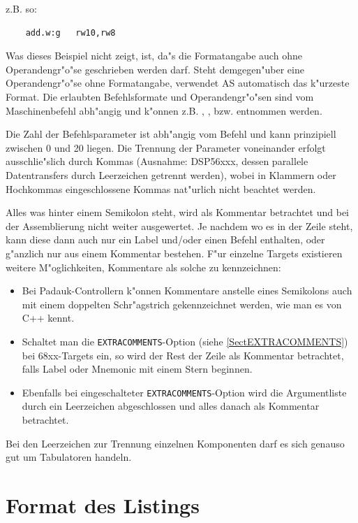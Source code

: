 \documentclass[12pt,a4paper,twoside]{report}
\newcommand{\tty}[1]{{\tt #1}}
\newcommand{\asname}{AS}
\begin{document}
z.B. so:
\begin{verbatim}
    add.w:g   rw10,rw8
\end{verbatim}
Was dieses Beispiel nicht zeigt, ist, da"s die Formatangabe auch ohne
Operandengr"o"se geschrieben werden darf.  Steht demgegen"uber eine
Operandengr"o"se ohne Formatangabe, verwendet \asname{} automatisch das
k"urzeste Format.  Die erlaubten Befehlsformate und Operandengr"o"sen
sind vom Maschinenbefehl abh"angig und k"onnen z.B. \cite{Tosh9000},
\cite{HitH8_5}, \cite{MitM16} bzw. \cite{MitM16C} entnommen werden.
\par
Die Zahl der Befehlsparameter ist abh"angig vom Befehl und kann
prinzipiell zwischen 0 und 20 liegen.  Die Trennung der Parameter
voneinander erfolgt ausschlie"slich durch Kommas (Ausnahme: DSP56xxx,
dessen parallele Datentransfers durch Leerzeichen getrennt werden),
wobei in Klammern oder Hochkommas eingeschlossene Kommas nat"urlich
nicht beachtet werden.
\par
Alles was hinter einem Semikolon steht, wird als Kommentar betrachtet
und bei der Assemblierung nicht weiter ausgewertet.  Je nachdem
wo es in der Zeile steht, kann diese dann auch nur ein Label und/oder
einen Befehl enthalten, oder g"anzlich nur aus einem Kommentar bestehen.
F"ur einzelne Targets existieren weitere M"oglichkeiten, Kommentare als
solche zu kennzeichnen:
\begin{itemize}
\item{Bei Padauk-Controllern k"onnen Kommentare anstelle eines
      Semikolons auch mit einem doppelten Schr"agstrich gekennzeichnet
      werden, wie man es von C++ kennt.}
\item{Schaltet man die \tty{EXTRACOMMENTS}-Option (siehe \ref{SectEXTRACOMMENTS})
      bei 68xx-Targets ein, so wird der Rest der Zeile als Kommentar
      betrachtet, falls Label oder Mnemonic mit einem Stern beginnen.}
\item{Ebenfalls bei eingeschalteter \tty{EXTRACOMMENTS}-Option wird
      die Argumentliste durch ein Leerzeichen abgeschlossen und alles
      danach als Kommentar betrachtet.}
\end{itemize}
\par
Bei den Leerzeichen zur Trennung einzelnen Komponenten darf es sich
genauso gut um Tabulatoren handeln.


\section{Format des Listings}
\label{SectListing}
\end{document}
